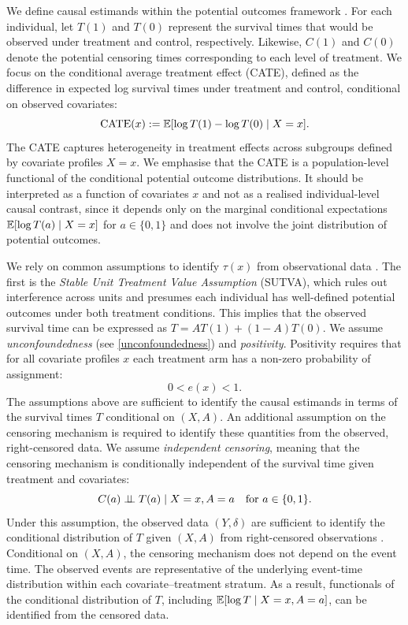 We define causal estimands within the potential outcomes framework \citep{Rubin1974, Rubin1978}. 
For each individual, let $T(1)$ and $T(0)$ represent the survival times that would be observed under treatment and control, respectively. 
Likewise, $C(1)$ and $C(0)$ denote the potential censoring times corresponding to each level of treatment.
We focus on the conditional average treatment effect (CATE), defined as the difference in expected log survival times under treatment and control, conditional on observed covariates:
\begin{equation}
    \text{CATE}(x) := \mathbb{E}[\log T(1) - \log T(0) \mid X = x].
\end{equation}
The CATE captures heterogeneity in treatment effects across subgroups defined by covariate profiles $X = x$.  
We emphasise that the CATE is a population-level functional of the conditional potential outcome distributions.
It should be interpreted as a function of covariates $x$ and not as a realised individual-level causal contrast, since it depends only on the marginal conditional expectations $\mathbb{E}[\log T(a)\mid X=x]$ for $a\in\{0,1\}$ and does not involve the joint distribution of potential outcomes.


We rely on common assumptions to identify $\tau(x)$ from observational data \citep{ImbensRubin2015}.
The first is the \textit{Stable Unit Treatment Value Assumption} (SUTVA), which rules out interference across units and presumes each individual has well-defined potential outcomes under both treatment conditions.
This implies that the observed survival time can be expressed as $T = A T(1) + (1 - A) T(0)$.
We assume \textit{unconfoundedness} (see \eqref{unconfoundedness}) and \emph{positivity}.
Positivity requires that for all covariate profiles $x $ each treatment arm has a non-zero probability of assignment:
\begin{equation}
0 < e(x)  < 1.
\end{equation}
The assumptions above are sufficient to identify the causal estimands in terms of the survival times $T$ conditional on $(X,A)$. 
An additional assumption on the censoring mechanism is required to identify these quantities from the observed, right-censored data.
We assume \emph{independent censoring}, meaning that the censoring mechanism is conditionally independent of the survival time given treatment and covariates:
\begin{equation}
C(a) \perp\!\!\!\perp T(a) \mid X = x, A=a \quad\text{for } a \in \{0,1\}.
\end{equation}
Under this assumption, the observed data $(Y,\delta)$ are sufficient to identify the conditional distribution of $T$ given $(X,A)$ from right-censored observations \citep{Andersen1993, Lagakos1979}.
Conditional on $(X,A)$, the censoring mechanism does not depend on the event time.
The observed events are representative of the underlying event-time distribution within each covariate--treatment stratum.
As a result, functionals of the conditional distribution of $T$, including $\mathbb{E}[\log T \mid X=x,A=a]$, can be identified from the censored data.



